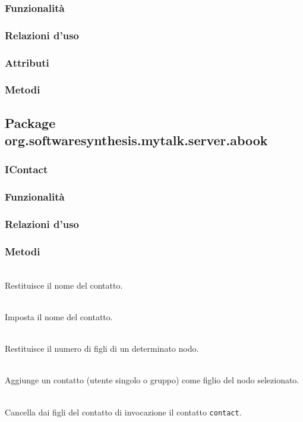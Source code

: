 \subsubsection*{Funzionalità}

\subsubsection*{Relazioni d'uso}

\subsubsection*{Attributi}

\subsubsection*{Metodi}

\subsection{Package org.softwaresynthesis.mytalk.server.abook}\label{sec:abook}

\subsubsection{IContact}\label{sec:icontact}

\subsubsection*{Funzionalità}

\subsubsection*{Relazioni d'uso}

\subsubsection*{Metodi}
\begin{description}
  \item{}\\
Restituisce il nome del contatto.
  \item{}\\
Imposta il nome del contatto.
  \item{}\\
Restituisce il numero di figli di un determinato nodo.
  \item{}\\
Aggiunge un contatto (utente singolo o gruppo) come figlio del nodo selezionato.
  \item{}\\
Cancella dai figli del contatto di invocazione il contatto \texttt{contact}.
\end{description}

